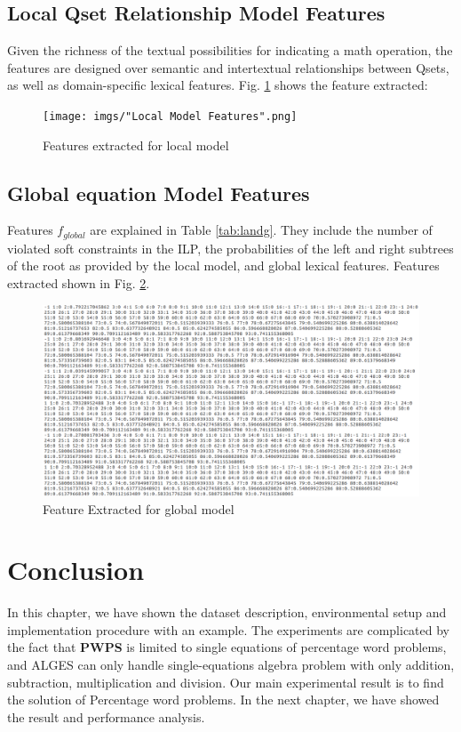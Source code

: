 \documentclass[document.tex]{subfiles}
\begin{document}
\begin{landscape}
\subsection{Local Qset Relationship Model Features}
 Given the richness of the textual possibilities for indicating a math operation, the features are designed over semantic and intertextual relationships between Qsets, as well as domain-specific lexical features. Fig. \ref{fig:i_Local} shows the feature extracted: 

	\begin{figure}[H]
		\texttt{[image: imgs/"Local Model Features".png]}
		\caption{Features extracted for local model}
		\label{fig:i_Local}
	\end{figure}
	\subsection{Global equation Model Features}
	Features $f_{global}$ are explained in Table \ref{tab:landg}. They include the number of violated soft constraints in the
	ILP, the probabilities of the left and right subtrees of
	the root as provided by the local model, and global
	lexical features. Features extracted shown in Fig. \ref{fig:i_global}. 
	
	\begin{figure}[H]
		\includegraphics[scale=0.500]{imgs/global_features.png}
		\caption{Feature Extracted for global model}
		\label{fig:i_global}
	\end{figure}
\end{landscape}
\section{Conclusion} In this chapter, we have shown the dataset description, environmental setup and implementation procedure with an example. The experiments are complicated by the fact that \textbf{PWPS} is limited to single equations of percentage word problems, and ALGES can only handle single-equations algebra problem with only addition, subtraction, multiplication and division. Our main experimental result is to find the solution of Percentage word problems. In the next chapter, we have showed the result and performance analysis.
\end{document}
